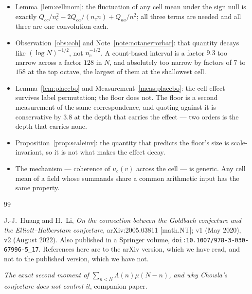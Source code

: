 \documentclass[11pt,a4paper]{article}
\theoremstyle{plain}
\theoremstyle{definition}
\theoremstyle{remark}
\begin{document}
\begin{itemize}
\item Lemma~\ref{lem:cellmom}: the fluctuation of any cell mean under
the sign null is exactly
$Q_{cc}/n_c^2-2Q_{ca}/(n_cn)+Q_{aa}/n^2$; all three terms are needed
and all three are one convolution each.

\item Observation~\ref{obs:coh} and Note~\ref{note:notanerrorbar}:
that quantity decays like $(\log N)^{-1/2}$, not $n_c^{-1/2}$. A
count-based interval is a factor $9.3$ too narrow across a factor
$128$ in $N$, and absolutely too narrow by factors of $7$ to $158$ at
the top octave, the largest of them at the shallowest cell.

\item Lemma~\ref{lem:placebo} and Measurement~\ref{meas:placebo}: the
cell effect survives label permutation; the floor does not. The floor
is a second measurement of the same correspondence, and quoting
against it is conservative by $3.8$ at the depth that carries the
effect --- two orders is the depth that carries none.

\item Proposition~\ref{prop:scaleinv}: the quantity that predicts the
floor's size is scale-invariant, so it is not what makes the effect
decay.

\item The mechanism --- coherence of $u_c(v)$ across the cell --- is
generic. Any cell mean of a field whose summands share a common
arithmetic input has the same property.
\end{itemize}

\begin{thebibliography}{99}

 J.-J.~Huang and H.~Li, \emph{On the connection between
the Goldbach conjecture and the Elliott--Halberstam conjecture},
arXiv:2005.03811 [math.NT]; v1 (May 2020), v2 (August 2022). Also
published in a Springer volume,
\texttt{doi:10.1007/978-3-030-67996-5\_17}. References here are to the
arXiv version, which we have read, and not to the published version,
which we have not.

 \emph{The exact second moment of
$\sum_{n<N}\Lambda(n)\mu(N-n)$, and why Chowla's conjecture does not
control it}, companion paper.

\end{thebibliography}

\appendix
\end{document}
